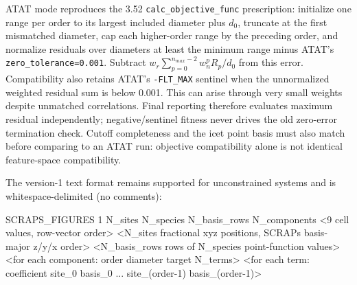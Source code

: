 \documentclass[
  11pt,
]{article}
\newenvironment{Shaded}{}{}
\newcommand{\NormalTok}[1]{#1}
\begin{document}
ATAT mode reproduces the 3.52 \texttt{calc\_objective\_func}
prescription: initialize one range per order to its largest included
diameter plus \(d_0\), truncate at the first mismatched diameter, cap
each higher-order range by the preceding order, and normalize residuals
over diameters at least the minimum range minus ATAT's
\texttt{zero\_tolerance=0.001}. Subtract
\(w_r\sum_{p=0}^{n_{max}-2}w_n^p R_p/d_0\) from this error.
Compatibility also retains ATAT's \texttt{-FLT\_MAX} sentinel when the
unnormalized weighted residual sum is below 0.001. This can arise
through very small weights despite unmatched correlations. Final
reporting therefore evaluates maximum residual independently;
negative/sentinel fitness never drives the old zero-error termination
check. Cutoff completeness and the icet point basis must also match
before comparing to an ATAT run: objective compatibility alone is not
identical feature-space compatibility.

The version-1 text format remains supported for unconstrained systems
and is whitespace-delimited (no comments):

\begin{Shaded}
\begin{Highlighting}[]
\NormalTok{SCRAPS\_FIGURES 1}
\NormalTok{N\_sites N\_species N\_basis\_rows N\_components}
\NormalTok{\textless{}9 cell values, row{-}vector order\textgreater{}}
\NormalTok{\textless{}N\_sites fractional xyz positions, SCRAPs basis{-}major z/y/x order\textgreater{}}
\NormalTok{\textless{}N\_basis\_rows rows of N\_species point{-}function values\textgreater{}}
\NormalTok{\textless{}for each component: order diameter target N\_terms\textgreater{}}
\NormalTok{\textless{}for each term: coefficient site\_0 basis\_0 ... site\_(order{-}1) basis\_(order{-}1)\textgreater{}}
\end{Highlighting}
\end{Shaded}
\end{document}
